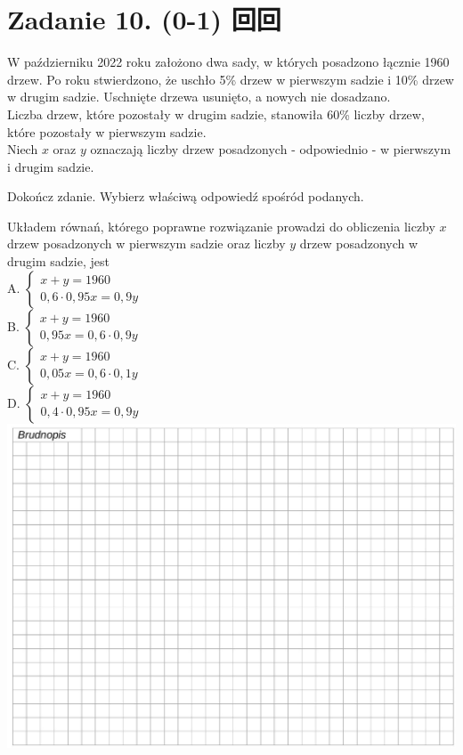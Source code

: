 \documentclass[10pt]{article}
\begin{document}
\section*{Zadanie 10. (0-1) 回回}
W październiku 2022 roku założono dwa sady, w których posadzono łącznie 1960 drzew. Po roku stwierdzono, że uschło 5\% drzew w pierwszym sadzie i 10\% drzew w drugim sadzie. Uschnięte drzewa usunięto, a nowych nie dosadzano.\\
Liczba drzew, które pozostały w drugim sadzie, stanowiła 60\% liczby drzew, które pozostały w pierwszym sadzie.\\
Niech \(x\) oraz \(y\) oznaczają liczby drzew posadzonych - odpowiednio - w pierwszym i drugim sadzie.

Dokończ zdanie. Wybierz właściwą odpowiedź spośród podanych.

Układem równań, którego poprawne rozwiązanie prowadzi do obliczenia liczby \(x\) drzew posadzonych w pierwszym sadzie oraz liczby \(y\) drzew posadzonych w drugim sadzie, jest\\
A. \(\left\{\begin{array}{l}x+y=1960 \\ 0,6 \cdot 0,95 x=0,9 y\end{array}\right.\)\\
B. \(\left\{\begin{array}{l}x+y=1960 \\ 0,95 x=0,6 \cdot 0,9 y\end{array}\right.\)\\
C. \(\left\{\begin{array}{l}x+y=1960 \\ 0,05 x=0,6 \cdot 0,1 y\end{array}\right.\)\\
D. \(\left\{\begin{array}{l}x+y=1960 \\ 0,4 \cdot 0,95 x=0,9 y\end{array}\right.\)\\
\includegraphics[max width=\textwidth, center]{2024_11_21_daeb5e5efb43dd4cb535g-10}
\end{document}
